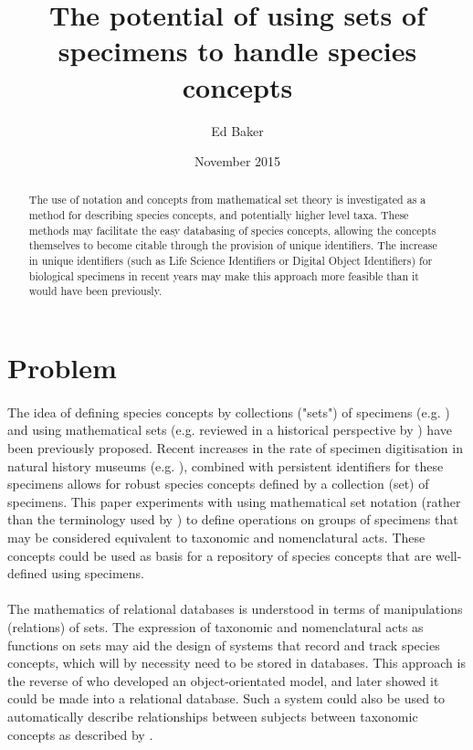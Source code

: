 \documentclass{article}
\title{The potential of using sets of specimens to handle species concepts}
\author{Ed Baker}
\date{November 2015}
\begin{document}
   \maketitle
   \begin{abstract}
   	The use of notation and concepts from mathematical set theory is investigated as a method for describing species concepts, and potentially higher level taxa. These methods may facilitate the easy databasing of species concepts, allowing the concepts themselves to become citable through the provision of unique identifiers. The increase in unique identifiers (such as Life Science Identifiers or Digital Object Identifiers) for biological specimens in recent years may make this approach more feasible than it would have been previously.
   \end{abstract}
   \tableofcontents
   \section{Problem}
   \paragraph{}
   The idea of defining species concepts by collections ("sets") of specimens (e.g. \cite{berendsohn1995,pullan2000}) and using mathematical sets (e.g. \cite{gregg1950,gregg1954} reviewed in a historical perspective by \cite{varma2013}) have been previously proposed. Recent increases in the rate of specimen digitisation in natural history museums (e.g. \cite{blagoderov2012}), combined with persistent identifiers for these specimens \cite{guralnick2015} allows for robust species concepts defined by a collection (set) of specimens. This paper experiments with using mathematical set notation (rather than the terminology used by \cite{franz2009}) to define operations on groups of specimens that may be considered equivalent to taxonomic and nomenclatural acts. These concepts could be used as basis for a repository of species concepts that are well-defined using specimens.
   \paragraph{}
   The mathematics of relational databases is understood in terms of manipulations (relations) of sets. The expression of taxonomic and nomenclatural acts as functions on sets may aid the design of systems that record and track species concepts, which will by necessity need to be stored in databases. This approach is the reverse of \cite{ytow2001} who developed an object-orientated model, and later showed it could be made into a relational database. Such a system could also be used to automatically describe relationships between subjects between taxonomic concepts as described by \cite{franz2009}.
\end{document}
